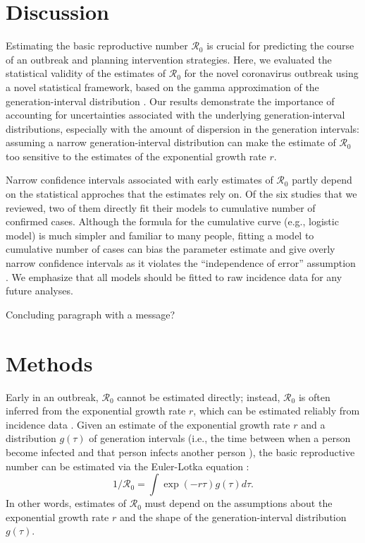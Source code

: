 \documentclass[12pt]{article}
\begin{document}
\section{Discussion}

Estimating the basic reproductive number $\mathcal R_0$ is crucial for predicting the course of an outbreak and planning intervention strategies.
Here, we evaluated the statistical validity of the estimates of $\mathcal R_0$ for the novel coronavirus outbreak using a novel statistical framework, based on the gamma approximation of the generation-interval distribution \citep{park2019practical}.
Our results demonstrate the importance of accounting for uncertainties associated with the underlying generation-interval distributions, especially with the amount of dispersion in the generation intervals:
assuming a narrow generation-interval distribution can make the estimate of $\mathcal R_0$ too sensitive to the estimates of the exponential growth rate $r$.

Narrow confidence intervals associated with early estimates of $\mathcal R_0$ partly depend on the statistical approches that the estimates rely on.
Of the six studies that we reviewed, two of them directly fit their models to cumulative number of confirmed cases.
Although the formula for the cumulative curve (e.g., logistic model) is much simpler and familiar to many people, 
fitting a model to cumulative number of cases can bias the parameter estimate and give overly narrow confidence intervals as it violates the ``independence of error'' assumption \citep{ma2014estimating, king2015avoidable}.
We emphasize that all models should be fitted to raw incidence data for any future analyses.



Concluding paragraph with a message?

\section{Methods}

Early in an outbreak, $\mathcal R_0$ cannot be estimated directly;
instead, $\mathcal R_0$ is often inferred from
the exponential growth rate $r$, which can be estimated reliably from incidence data \citep{mills2004transmissibility, nishiura2009transmission, ma2014estimating}. 
Given an estimate of the exponential growth rate $r$ and a distribution $g(\tau)$ of
generation intervals (i.e., the time between when a person become 
infected and that person infects another person \citep{svensson2007note}), the basic reproductive
number can be estimated via the Euler-Lotka equation \citep{wallinga2007generation}:
\begin{equation}
1/\mathcal R_0 = \int \exp(-r\tau) g(\tau) d\tau.
\end{equation}
In other words, estimates of $\mathcal R_0$ must
depend on the assumptions about the
exponential growth rate $r$ and the shape of the generation-interval distribution $g(\tau)$.
\end{document}
